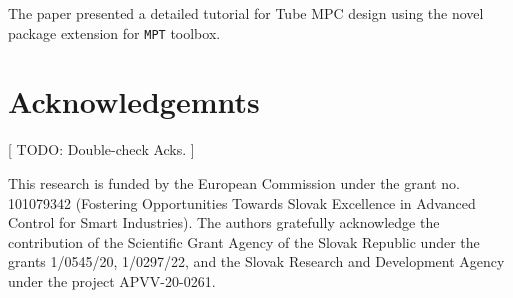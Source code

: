 \documentclass[letterpaper, 10 pt, conference]{ieeeconf}
\begin{document}
The paper presented a detailed tutorial for Tube MPC design using the novel package extension for \texttt{MPT} toolbox. 

\addtolength{\textheight}{-12cm}

\section*{Acknowledgemnts}

[ TODO: Double-check Acks. ]

This research is funded by the European Commission under the grant no. 101079342 (Fostering Opportunities Towards Slovak Excellence in Advanced Control for Smart Industries). The authors gratefully acknowledge the contribution of the Scientific Grant Agency of the Slovak Republic under the grants 1/0545/20, 1/0297/22, and the Slovak Research and Development Agency under the project APVV-20-0261. 




\end{document}
